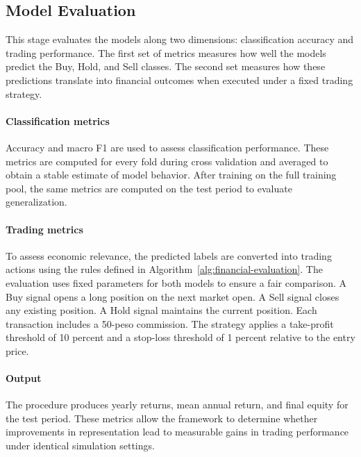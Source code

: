 \documentclass[12pt,a4paper]{article}
\begin{document}
\subsection{Model Evaluation}
\label{subsec:model-eval}

This stage evaluates the models along two dimensions: classification accuracy and trading performance. The first set of metrics measures how well the models predict the Buy, Hold, and Sell classes. The second set measures how these predictions translate into financial outcomes when executed under a fixed trading strategy.

\paragraph{Classification metrics}

Accuracy and macro F1 are used to assess classification performance. These metrics are computed for every fold during cross validation and averaged to obtain a stable estimate of model behavior. After training on the full training pool, the same metrics are computed on the test period to evaluate generalization.


\paragraph{Trading metrics}

To assess economic relevance, the predicted labels are converted into trading actions using the rules defined in Algorithm~\ref{alg:financial-evaluation}. The evaluation uses fixed parameters for both models to ensure a fair comparison. A Buy signal opens a long position on the next market open. A Sell signal closes any existing position. A Hold signal maintains the current position. Each transaction includes a 50-peso commission. The strategy applies a take-profit threshold of 10 percent and a stop-loss threshold of 1 percent relative to the entry price.

\paragraph{Output}

The procedure produces yearly returns, mean annual return, and final equity for the test period. These metrics allow the framework to determine whether improvements in representation lead to measurable gains in trading performance under identical simulation settings.
\end{document}
